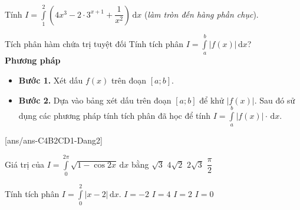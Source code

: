 \begin{ex}%
	Tính $I=\displaystyle\int\limits_1^2\left(4x^3-2\cdot3^{x+1}+\dfrac{1}{x^2} \right) \mathrm{\,d}x$ (\textit{làm tròn đến hàng phần chục}).
\end{ex}

\begin{dang}{Tích phân hàm chứa trị tuyệt đối}
	Tính tích phân $I=\int\limits_a^b|f(x)| \mathrm{\,d}x$?\\
	\textbf{Phương pháp}
	\begin{itemize}
		\item \textbf{Bước 1.} Xét dấu $f(x)$ trên đoạn $[a ; b]$.
		\item \textbf{Bước 2.} Dựa vào bảng xét dấu trên đoạn $[a ; b]$ để khử $|f(x)|$. Sau đó sử dụng các phương pháp tính tích phân đã học để tính $I=\int\limits_a^b|f(x)| \cdot \mathrm{\,d}x$.
	\end{itemize}
\end{dang}

[ans/ans-C4B2CD1-Dang2]
\TN
\begin{ex}%
	Giá trị của $I=\displaystyle\int\limits _0^{2\pi}\sqrt{1-\cos 2x} \mathrm{\,d}x$ bằng
	\choice
	{$\sqrt{3}$}
	{\True $4\sqrt{2}$}
	{$2\sqrt{3}$}
	{$\dfrac{\pi}{2}$}
\end{ex}
\begin{ex}%
	Tính tích phân $I=\displaystyle\int\limits _0^2\left|x-2\right|\mathrm{\,d}x$.
	\choice
	{$I=-2$}
	{$I=4$}
	{\True $I=2$}
	{$I=0$}
\end{ex}


